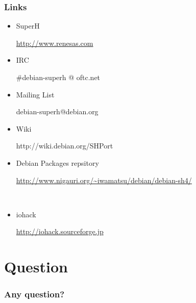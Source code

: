 \documentclass[cjk,dvipdfmx,12pt]{beamer}
\begin{document}
\begin{frame}

 \frametitle{Links}
   \begin{itemize}
    \item SuperH 
		
		\url{http://www.renesas.com}
    \item IRC 

		\#debian-superh @ oftc.net
    \item Mailing List

		debian-superh@debian.org
    \item Wiki 

		http://wiki.debian.org/SHPort
    \item Debian Packages repsitory

	\url{http://www.nigauri.org/~iwamatsu/debian/debian-sh4/}

　　\item iohack

	\url{http://iohack.sourceforge.jp}
   \end{itemize}
\end{frame}

\section{Question}
\begin{frame}
 \frametitle{Any question?}

\end{frame}
\end{document}
